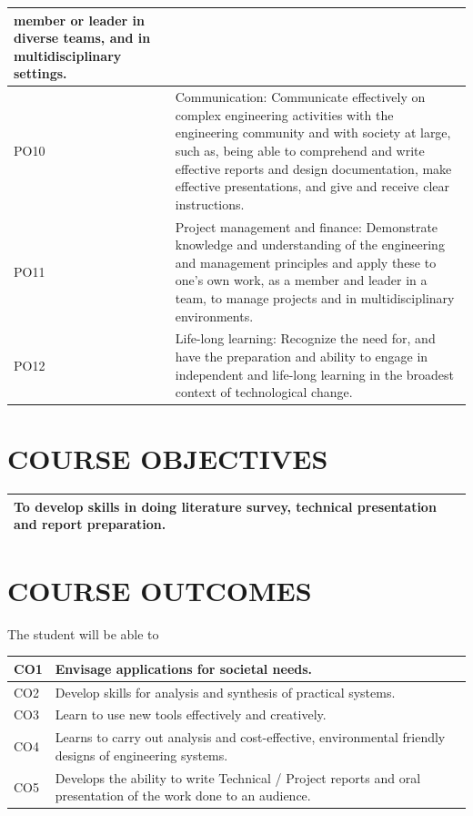 \documentclass[12pt,a4paper]{report}
\begin{document}
\begin{longtable}{| p{} | p{} |}
member or leader in diverse teams, and in multidisciplinary settings.
 \\
\hline
PO10 & Communication: Communicate effectively on complex engineering activities
with the engineering community and with society at large, such as, being able to
comprehend and write effective reports and design documentation, make
effective presentations, and give and receive clear instructions.
 \\
\hline
PO11 & Project management and finance: Demonstrate knowledge and understanding of
the engineering and management principles and apply these to one’s own work,
as a member and leader in a team, to manage projects and in multidisciplinary
environments.
 \\
\hline
PO12 & Life-long learning: Recognize the need for, and have the preparation and ability
to engage in independent and life-long learning in the broadest context of
technological change.

 \\
\hline

\end{longtable}
\vspace{2cm}
\section*{\hfil\normalsize{\textbf{COURSE OBJECTIVES }}\hfil}
\doublespacing


\begin{longtable}{| p{} |}
\hline
To develop skills in doing literature survey, technical presentation and report preparation.
\\
\hline



\end{longtable}



\section*{\hfil\normalsize{\textbf{COURSE OUTCOMES }}\hfil}
\doublespacing
The student will be able to
\begin{longtable}{| p{} | p{} |}
\hline
CO1 & Envisage applications for societal needs.
\\
\hline
CO2 & Develop skills for analysis and synthesis of practical systems.
 \\
\hline
CO3 & Learn to use new tools effectively and creatively.
 \\
\hline
CO4 & Learns to carry out analysis and cost-effective, environmental friendly designs of engineering
systems.
 \\
\hline
CO5 & Develops the ability to write Technical / Project reports and oral presentation of the work done to an audience.
\\
\hline
\end{longtable}
\end{document}
